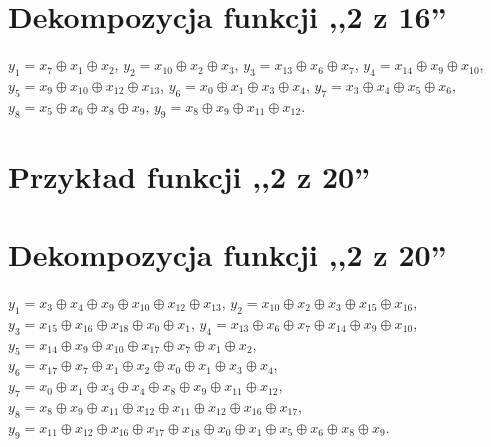 \section*{Dekompozycja funkcji ,,2 z 16''}
\label{file:2outof16.txt}
\noindent
$y_1 = x_7 \oplus x_1 \oplus x_2$, \newline
$y_2 = x_{10} \oplus x_2 \oplus x_3$, \newline
$y_3 = x_{13} \oplus x_6 \oplus x_7$, \newline
$y_4 = x_{14} \oplus x_9 \oplus x_{10}$, \newline
$y_5 = x_9 \oplus x_{10} \oplus x_{12} \oplus x_{13}$, \newline
$y_6 = x_0 \oplus x_1 \oplus x_3 \oplus x_4$, \newline
$y_7 = x_3 \oplus x_4 \oplus x_5 \oplus x_6$, \newline
$y_8 = x_5 \oplus x_6 \oplus x_8 \oplus x_9$, \newline
$y_9 = x_8 \oplus x_9 \oplus x_{11} \oplus x_{12}$. \newline

\clearpage

\section*{Przykład funkcji ,,2 z 20''}
\label{file:2outof20.pla}

\clearpage

\section*{Dekompozycja funkcji ,,2 z 20''}
\label{file:2outof20.txt}
\noindent
$y_1 = x_3 \oplus x_4 \oplus x_9 \oplus x_{10} \oplus x_{12} \oplus x_{13}$, \newline
$y_2 = x_{10} \oplus x_2 \oplus x_3 \oplus x_{15} \oplus x_{16}$, \newline
$y_3 = x_{15} \oplus x_{16} \oplus x_{18} \oplus x_0 \oplus x_1$,  \newline
$y_4 = x_{13} \oplus x_6 \oplus x_7 \oplus x_{14} \oplus x_9 \oplus x_{10}$,  \newline
$y_5 = x_{14} \oplus x_9 \oplus x_{10} \oplus x_{17} \oplus x_7 \oplus x_1 \oplus x_2$,  \newline
$y_6 = x_{17} \oplus x_7 \oplus x_1 \oplus x_2 \oplus x_0 \oplus x_1 \oplus x_3 \oplus x_4$,  \newline
$y_7 = x_0 \oplus x_1 \oplus x_3 \oplus x_4 \oplus x_8 \oplus x_9 \oplus x_{11} \oplus x_{12}$,  \newline
$y_8 = x_8 \oplus x_9 \oplus x_{11} \oplus x_{12} \oplus x_{11} \oplus x_{12} \oplus x_{16} \oplus x_{17}$,  \newline
$y_9 = x_{11} \oplus x_{12} \oplus x_{16} \oplus x_{17} \oplus x_{18} \oplus x_0 \oplus x_1 \oplus x_5 \oplus x_6 \oplus x_8 \oplus x_9$. \newline

\clearpage